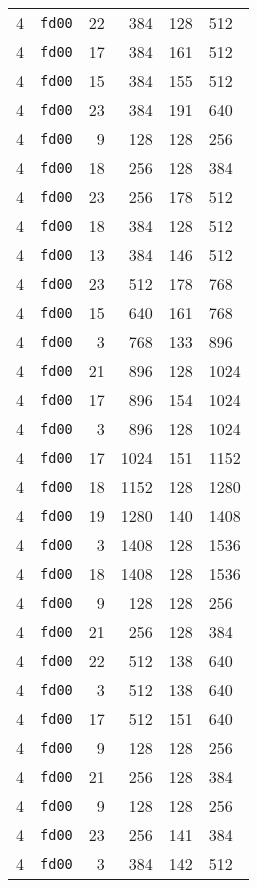 \documentclass{article}
\begin{document}
\begin{table}[h!]
\begin{tabular}{llrrrl}
    4 & \texttt{fd00} & 22 & 384 & 128 & 512 \\
    4 & \texttt{fd00} & 17 & 384 & 161 & 512 \\
    4 & \texttt{fd00} & 15 & 384 & 155 & 512 \\
    4 & \texttt{fd00} & 23 & 384 & 191 & 640 \\
    4 & \texttt{fd00} & 9 & 128 & 128 & 256 \\
    4 & \texttt{fd00} & 18 & 256 & 128 & 384 \\
    4 & \texttt{fd00} & 23 & 256 & 178 & 512 \\
    4 & \texttt{fd00} & 18 & 384 & 128 & 512 \\
    4 & \texttt{fd00} & 13 & 384 & 146 & 512 \\
    4 & \texttt{fd00} & 23 & 512 & 178 & 768 \\
    4 & \texttt{fd00} & 15 & 640 & 161 & 768 \\
    4 & \texttt{fd00} & 3 & 768 & 133 & 896 \\
    4 & \texttt{fd00} & 21 & 896 & 128 & 1024 \\
    4 & \texttt{fd00} & 17 & 896 & 154 & 1024 \\
    4 & \texttt{fd00} & 3 & 896 & 128 & 1024 \\
    4 & \texttt{fd00} & 17 & 1024 & 151 & 1152 \\
    4 & \texttt{fd00} & 18 & 1152 & 128 & 1280 \\
    4 & \texttt{fd00} & 19 & 1280 & 140 & 1408 \\
    4 & \texttt{fd00} & 3 & 1408 & 128 & 1536 \\
    4 & \texttt{fd00} & 18 & 1408 & 128 & 1536 \\
    4 & \texttt{fd00} & 9 & 128 & 128 & 256 \\
    4 & \texttt{fd00} & 21 & 256 & 128 & 384 \\
    4 & \texttt{fd00} & 22 & 512 & 138 & 640 \\
    4 & \texttt{fd00} & 3 & 512 & 138 & 640 \\
    4 & \texttt{fd00} & 17 & 512 & 151 & 640 \\
    4 & \texttt{fd00} & 9 & 128 & 128 & 256 \\
    4 & \texttt{fd00} & 21 & 256 & 128 & 384 \\
    4 & \texttt{fd00} & 9 & 128 & 128 & 256 \\
    4 & \texttt{fd00} & 23 & 256 & 141 & 384 \\
    4 & \texttt{fd00} & 3 & 384 & 142 & 512 \\

\end{tabular}
\end{table}
\end{document}
